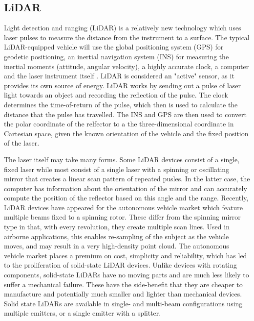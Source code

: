\documentclass[10pt]{report}
\begin{document}
\subsection{LiDAR}

Light detection and ranging (LiDAR) is a relatively new technology which uses laser pulses to measure the distance from the instrument to a surface. The typical LiDAR-equipped vehicle will use the global positioning system (GPS) for geodetic positioning, an inertial navigation system (INS) for measuring the inertial moments (attitude, angular velocity), a highly accurate clock, a computer and the laser instrument itself \cite{May2007,Lillesand1999}. LiDAR is considered an "active" sensor, as it provides its own source of energy. LiDAR works by sending out a pulse of laser light towards an object and recording the reflection of the pulse. The clock determines the time-of-return of the pulse, which then is used to calculate the distance that the pulse has travelled. The INS and GPS are then used to convert the polar coordinate of the relfector to a the three-dimensional coordinate in Cartesian space, given the known orientation of the vehicle and the fixed position of the laser. 

The laser itself may take many forms. Some LiDAR devices consist of a single, fixed laser while most consist of a single laser with a spinning or oscillating mirror that creates a linear scan pattern of repeated pusles. In the latter case, the computer has information about the orientation of the mirror and can accurately compute the position of the reflector based on this angle and the range. Recently, LiDAR devices have appeared for the autonomous vehicle market which feature multiple beams fixed to a spinning rotor. These differ from the spinning mirror type in that, with every revolution, they create multiple scan lines. Used in airborne applications, this enables re-sampling of the subject as the vehicle moves, and may result in a very high-density point cloud. The autonomous vehicle market places a premium on cost, simplicity and reliability, which has led to the proliferation of solid-state LiDAR devices. Unlike devices with rotating components, solid-state LiDARs have no moving parts and are much less likely to suffer a mechanical failure. These have the side-benefit that they are cheaper to manufacture and potentially much smaller and lighter than mechanical devices. Solid state LiDARs are available in single- and multi-beam configurations using multiple emitters, or a single emitter with a splitter.
\end{document}
